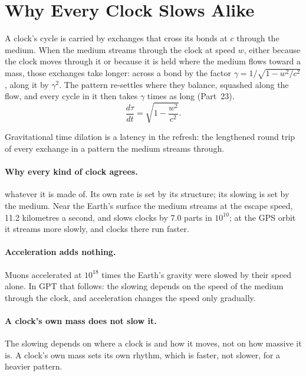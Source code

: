 \documentclass[11pt,a4paper]{article}
\begin{document}
\section{Why Every Clock Slows Alike}
\label{sec:slowing}

\begin{hypbar}
A clock's cycle is carried by exchanges that cross its bonds at $c$ through the medium. When the medium streams through the clock at speed $w$, either because the clock moves through it or because it is held where the medium flows toward a mass, those exchanges take longer: across a bond by the factor $\gamma = 1/\sqrt{1-w^2/c^2}$, along it by $\gamma^2$. The pattern re-settles where they balance, squashed along the flow, and every cycle in it then takes $\gamma$ times as long (Part~23).
\begin{equation}
\frac{d\tau}{dt} = \sqrt{1 - \frac{w^2}{c^2}} .
\label{eq:clock}
\end{equation}
\end{hypbar}

Gravitational time dilation is a latency in the refresh: the lengthened round trip of every exchange in a pattern the medium streams through.

\paragraph{Why every kind of clock agrees.}  whatever it is made of. Its own rate is set by its structure; its slowing is set by the medium. Near the Earth's surface the medium streams at the escape speed, 11.2 kilometres a second, and slows clocks by 7.0 parts in $10^{10}$; at the GPS orbit it streams more slowly, and clocks there run faster.

\paragraph{Acceleration adds nothing.} Muons accelerated at $10^{18}$ times the Earth's gravity were slowed by their speed alone. In GPT that follows: the slowing depends on the speed of the medium through the clock, and acceleration changes the speed only gradually.

\paragraph{A clock's own mass does not slow it.} The slowing depends on where a clock is and how it moves, not on how massive it is. A clock's own mass sets its own rhythm, which is faster, not slower, for a heavier pattern.
\end{document}
